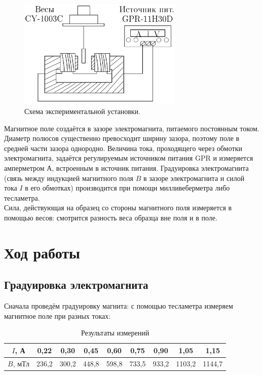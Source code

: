 \documentclass[a4paper, 12pt]{article}
\begin{document}
	\begin{figure}
		\centering
		\includegraphics[width = 0.7\textwidth, height = 0.3\textheight]{pictures/ustanovka.png}
		\caption{Схема экспериментальной установки.}
	\end{figure}
	
	
	Магнитное поле создаётся в зазоре электромагнита, питаемого постоянным током. Диаметр полюсов существенно превосходит ширину зазора, поэтому поле в средней части зазора однородно. Величина тока, проходящего через обмотки электромагнита, задаётся регулируемым источником питания GPR и измеряется амперметром $ А $, встроенным в источник питания. Градуировка электромагнита (связь между индукцией магнитного поля $ B $ в зазоре электромагнита и силой тока $ I $ в его обмотках) производится при помощи милливеберметра либо тесламетра.\\
	Сила, действующая на образец со стороны магнитного поля измеряется в помощью весов: смотрится разность веса образца вне поля и в поле.
	
	\section*{Ход работы}
	
	\subsection*{Градуировка электромагнита}
	
	Сначала проведём градуировку магнита: с помощью тесламетра измеряем магнитное поле при разных токах:
	
	\begin{table}[H]
		\centering
		\begin{tabular}{|c|c|c|c|c|c|c|c|c|}
			\hline
			$ I $, А   & 0,22   & 0,30   & 0,45   & 0,60   & 0,75   & 0,90   & 1,05   & 1,15 \\ \hline
			$ B $, мТл & 236,2 & 300,2 & 448,8 & 598,8 & 733,5 & 933,2 & 1103,2 & 1144,7 \\ \hline 
		\end{tabular}
		\caption{Результаты измерений}
	\end{table}
	
\end{document}
